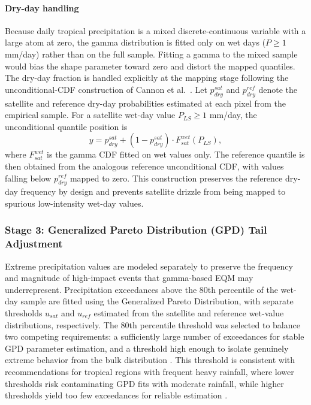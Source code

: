 \documentclass[11pt,a4paper]{article}
\begin{document}
\paragraph{Dry-day handling} Because daily tropical precipitation is a
mixed discrete-continuous variable with a large atom at zero, the gamma
distribution is fitted only on wet days (\(P \geq 1\) mm/day) rather
than on the full sample. Fitting a gamma to the mixed sample would bias
the shape parameter toward zero and distort the mapped quantiles. The
dry-day fraction is handled explicitly at the mapping stage following
the unconditional-CDF construction of Cannon et al.~\cite{ref11}. Let
\(p_{dry}^{sat}\) and \(p_{dry}^{ref}\) denote the satellite and
reference dry-day probabilities estimated at each pixel from the
empirical sample. For a satellite wet-day value \(P_{LS} \geq 1\)
mm/day, the unconditional quantile position is
\begin{equation}y = p_{dry}^{sat} + (1 - p_{dry}^{sat}) \cdot F_{sat}^{wet}(P_{LS}),\end{equation}
where \(F_{sat}^{wet}\) is the gamma CDF fitted on wet values only. The
reference quantile is then obtained from the analogous reference
unconditional CDF, with values falling below \(p_{dry}^{ref}\) mapped to
zero. This construction preserves the reference dry-day frequency by
design and prevents satellite drizzle from being mapped to spurious
low-intensity wet-day values.

\subsubsection{Stage 3: Generalized Pareto Distribution (GPD) Tail Adjustment}\label{stage-3-gpd}

Extreme precipitation values are modeled separately to preserve the
frequency and magnitude of high-impact events that gamma-based EQM may
underrepresent. Precipitation exceedances above the 80th percentile of
the wet-day sample are fitted using the Generalized Pareto Distribution,
with separate thresholds \(u_{sat}\) and \(u_{ref}\) estimated from the
satellite and reference wet-value distributions, respectively. The 80th
percentile threshold was selected to balance two competing requirements:
a sufficiently large number of exceedances for stable GPD parameter
estimation, and a threshold high enough to isolate genuinely extreme
behavior from the bulk distribution \cite{ref7}. This threshold is
consistent with recommendations for tropical regions with frequent heavy
rainfall, where lower thresholds risk contaminating GPD fits with
moderate rainfall, while higher thresholds yield too few exceedances for
reliable estimation \cite{ref25}.
\end{document}
